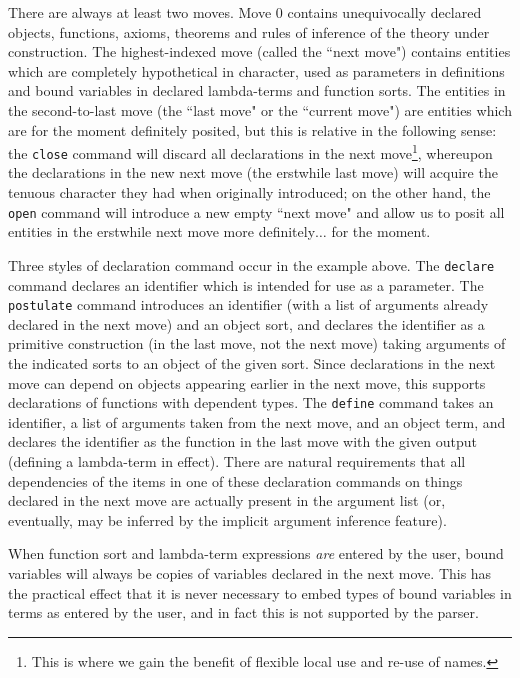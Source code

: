 \documentclass[12pt]{article}
\begin{document}
There are always at least two moves.  Move 0 contains unequivocally declared objects, functions, axioms, theorems and rules of inference of the theory under construction. 
The highest-indexed move (called the ``next move") contains entities which are completely hypothetical in character, used as parameters in definitions and bound variables
in declared lambda-terms and function sorts.  The entities in the second-to-last move (the ``last move" or the ``current move") are entities which are for the moment definitely
posited, but this is relative in the following sense:  the {\tt close} command will discard all declarations in the next move\footnote{This is where we gain the benefit of flexible local use and re-use of names.}, whereupon the declarations in the new next move (the erstwhile last move) will acquire the tenuous character they had when originally introduced;  on the other hand, the {\tt open} command will introduce a new empty ``next move" and allow us to posit all entities
in the erstwhile next move more definitely$\ldots$ for the moment.

Three styles of declaration command occur in the example above.  The {\tt declare} command declares an identifier which is intended for use as a parameter.
The {\tt postulate} command introduces an identifier (with a list of arguments already declared in the next move) and an object sort, and declares the identifier
as a primitive construction (in the last move, not the next move) taking arguments of the indicated sorts to an object of the given sort.  Since declarations in the next move can depend on objects appearing earlier in the next move, this supports declarations of functions with dependent types.  The {\tt define} command takes an identifier, a list of arguments taken from the next move, and an object term, and declares the identifier as the function in the last move with the given output (defining a lambda-term in effect).  There are natural requirements
that all dependencies of the items in one of these declaration commands on things declared in the next move are actually present in the argument list (or, eventually, may be inferred by the implicit argument inference feature).

When function sort and lambda-term expressions {\em are\/} entered by the user, bound variables will always be copies of variables declared in the next move.  This has the practical effect
that it is never necessary to embed types of bound variables in terms as entered by the user, and in fact this is not supported by the parser.
\end{document}
